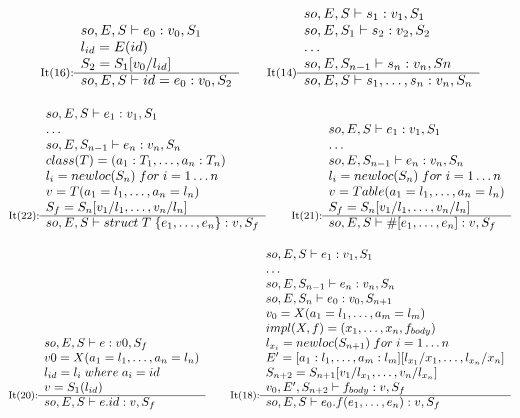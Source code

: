 \[
\inference[It(16):]
{
so,E,S|-e_0:v_0,S_1\\
l_{id} = E(id) \\
S_2 = S_1[v_0/l_{id}]
}
{so, E, S|-id = e_0:v_0, S_2}
\quad\quad
\inference[It(14)]
{
so, E, S|-s_1:v_1,S_1 \\
so, E, S_1|-s_2:v_2,S_2 \\
\dots \\
so, E, S_{n-1}|-s_n:v_n,Sn
}
{so, E, S|-s_1,\dots,s_n:v_n,S_n}
\]

\[
\inference[It(22):]
{
so,E,S|-e_1:v_1,S_1 \\
\ldots \\
so,E,S_{n-1}|-e_n:v_n,S_n \\
class(T)=(a_1:T_1, \ldots, a_n:T_n) \\  %
l_i = newloc(S_n) \; for \; i = 1 \ldots n \\
v=T(a_1=l_1, \ldots, a_n=l_n) \\ %
S_f = S_n[v_1/l_1, \ldots, v_n/l_n]
}
{so, E, S|-struct\;T\;\{ e_1, \ldots, e_n \}:v,S_f}
\quad\quad
\inference[It(21):]
{
so,E,S|-e_1:v_1,S_1 \\
\ldots \\
so,E,S_{n-1}|-e_n:v_n,S_n \\
l_i = newloc(S_n) \; for \; i = 1 \ldots n \\
v=Table(a_1=l_1, \ldots, a_n=l_n) \\
S_f = S_n[v_1/l_1, \ldots, v_n/l_n]
}
{so, E, S|-\#[e_1, \ldots, e_n]:v,S_f}
\]

\[
\inference[It(20):]{
so,E,S|-e:v0,S_f \\
v0 = X(a_1=l_1, \dots, a_n=l_n) \\
l_{id} = l_i \; where \; a_i = id \\
v = S_1(l_{id}) \\
}
{so,E,S|-e.id:v,S_f}
\quad\quad
\inference[It(18):]{
so,E,S|-e_1:v_1,S_1 \\
\ldots \\
so,E,S_{n-1}|-e_n:v_n,S_n \\
so,E,S_n|-e_0:v_0,S_{n+1} \\
v_0 = X(a_1=l_1, \dots, a_m=l_m) \\
impl(X,f) = (x_1, \dots, x_n, f_{body}) \\
l_{x_i} = newloc(S_{n+1}) \; for \; i = 1 \dots n \\
E' = [a_1:l_1, \dots, a_m:l_m][l_{x_1}/x_1, \dots, l_{x_n}/x_n] \\
S_{n+2} = S_{n+1}[v_1/l_{x_1}, \dots, v_n/l_{x_n}] \\
v_0, E', S_{n+2}|-f_{body}:v,S_f
}
{so,E,S|-e_0.f(e_1, \ldots, e_n):v,S_f}
\]

